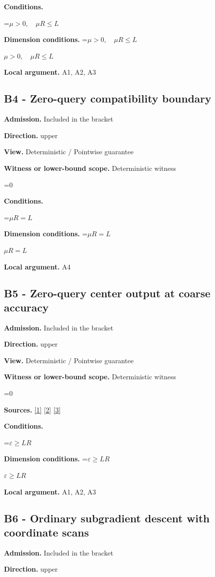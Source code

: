 \documentclass[10pt,a4paper]{article}
\newcommand{\AtlasMath}[1]{\par\begingroup\centering\setbox0=\hbox{$\displaystyle #1$}\ifdim\wd0>1.4\linewidth\typeout{ATLAS WIDE FORMULA: \the\wd0}\fi\ifdim\wd0>\linewidth\resizebox{\linewidth}{!}{\box0}\else\box0\fi\par\endgroup}
\newcommand{\AtlasInlineMath}[1]{\begingroup\setbox0=\hbox{$#1$}\ifdim\wd0>.4\linewidth\endgroup\AtlasMath{#1}\else\endgroup$#1$\fi}
\begin{document}
\textbf{Conditions.} 
\AtlasMath{\mu>0,\quad\mu R\le L}


\textbf{Dimension conditions.} \AtlasInlineMath{\mu>0,\quad\mu R\le L}

\textbf{Local argument.} A1, A2, A3

\subsection{B4 - Zero-query compatibility boundary}
\textbf{Admission.} Included in the bracket

\textbf{Direction.} upper

\textbf{View.} Deterministic / Pointwise guarantee

\textbf{Witness or lower-bound scope.} Deterministic witness

\AtlasMath{0}
\textbf{Conditions.} 
\AtlasMath{\mu R=L}


\textbf{Dimension conditions.} \AtlasInlineMath{\mu R=L}

\textbf{Local argument.} A4

\subsection{B5 - Zero-query center output at coarse accuracy}
\textbf{Admission.} Included in the bracket

\textbf{Direction.} upper

\textbf{View.} Deterministic / Pointwise guarantee

\textbf{Witness or lower-bound scope.} Deterministic witness

\AtlasMath{0}
\textbf{Sources.} \href{https://arxiv.org/pdf/1405.4980}{[1]} \href{https://www2.isye.gatech.edu/~nemirovs/MOR_AccuracyCertificates.pdf}{[2]} \href{https://arxiv.org/pdf/2609.20701}{[3]}

\textbf{Conditions.} 
\AtlasMath{\varepsilon\ge LR}


\textbf{Dimension conditions.} \AtlasInlineMath{\varepsilon\ge LR}

\textbf{Local argument.} A1, A2, A3

\subsection{B6 - Ordinary subgradient descent with coordinate scans}
\textbf{Admission.} Included in the bracket

\textbf{Direction.} upper
\end{document}
